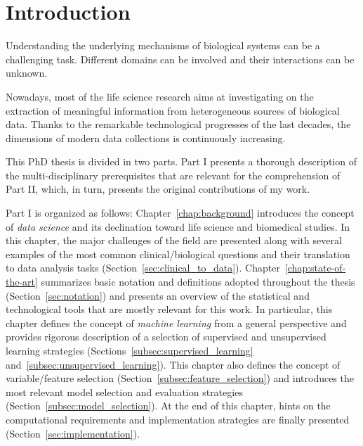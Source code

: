 
\chapter{Introduction} \label{chapter:introduction}
Understanding the underlying mechanisms of biological systems can be a challenging task. Different domains can be involved and their interactions can be unknown.

Nowadays, most of the life science research aims at investigating on the extraction of meaningful information from heterogeneous sources of biological data. Thanks to the remarkable technological progresses of the last decades, the dimensions of modern data collections is continuously increasing.

This PhD thesis is divided in two parts. Part I presents a thorough description of the multi-disciplinary prerequisites that are relevant for the comprehension of Part II, which, in turn, presents the original contributions of my work.

Part I is organized as follows: Chapter~\ref{chap:background} introduces the concept of \textit{data science} and its declination toward life science and biomedical studies. In this chapter, the major challenges of the field are presented along with several examples of the most common clinical/biological questions and their translation to data analysis tasks (Section~\ref{sec:clinical_to_data}).
Chapter~\ref{chap:state-of-the-art} summarizes basic notation and definitions adopted throughout the thesis (Section~\ref{sec:notation}) and presents an overview of the statistical and technological tools that are mostly relevant for this work. In particular, this chapter defines the concept of \textit{machine learning} from a general perspective and provides rigorous description of a selection of supervised and unsupervised learning strategies (Sections~\ref{subsec:supervised_learning} and~\ref{subsec:unsupervised_learning}).
This chapter also defines the concept of variable/feature selection (Section~\ref{subsec:feature_selection}) and introduces the most relevant model selection and evaluation strategies (Section~\ref{subsec:model_selection}).
At the end of this chapter, hints on the computational requirements and implementation strategies are finally presented (Section~\ref{sec:implementation}).

